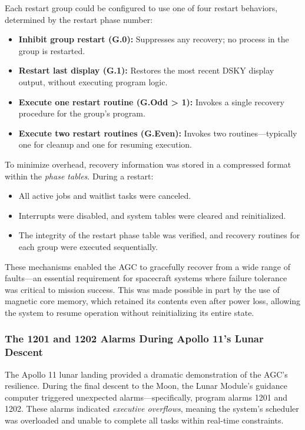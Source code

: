 Each restart group could be configured to use one of four restart behaviors, determined
by the restart phase number:
\begin{itemize}
    \item \textbf{Inhibit group restart (G.0):} Suppresses any recovery; no process in
        the group is restarted.
    \item \textbf{Restart last display (G.1):} Restores the most recent DSKY display
        output, without executing program logic.
    \item \textbf{Execute one restart routine (G.Odd > 1):} Invokes a single recovery
        procedure for the group’s program.
    \item \textbf{Execute two restart routines (G.Even):} Invokes two
        routines—typically one for cleanup and one for resuming execution.
\end{itemize}

To minimize overhead, recovery information was stored in a compressed format within the
\emph{phase tables}. During a restart:
\begin{itemize}
    \item All active jobs and waitlist tasks were canceled.
    \item Interrupts were disabled, and system tables were cleared and reinitialized.
    \item The integrity of the restart phase table was verified, and recovery routines
        for each group were executed sequentially.
\end{itemize}

These mechanisms enabled the AGC to gracefully recover from a wide range of faults—an
essential requirement for spacecraft systems where failure tolerance was critical to
mission success. This was made possible in part by the use of magnetic core memory,
which retained its contents even after power loss, allowing the system to resume
operation without reinitializing its entire state.


\subsubsection{The 1201 and 1202 Alarms During Apollo 11's Lunar Descent}

The Apollo 11 lunar landing provided a dramatic demonstration of the AGC's resilience.
During the final descent to the Moon, the Lunar Module's guidance computer triggered
unexpected alarms—specifically, program alarms 1201 and 1202. These alarms indicated
\emph{executive overflows}, meaning the system's scheduler was overloaded and unable to
complete all tasks within real-time constraints.

